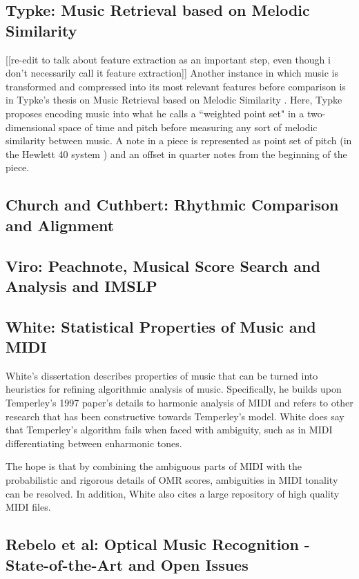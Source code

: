 \subsection{Typke: Music Retrieval based on Melodic Similarity}
[[re-edit to talk about feature extraction as an important step, even though i don't necessarily call it feature extraction]]
Another instance in which music is transformed and compressed into its most relevant features before comparison is in Typke's thesis on Music Retrieval based on Melodic Similarity \cite{typke}. Here, Typke proposes encoding music into what he calls a ``weighted point set" in a two-dimensional space of time and pitch before measuring any sort of melodic similarity between music. A note in a piece is represented as point set of pitch (in the Hewlett 40 system \cite{typke}) and an offset in quarter notes from the beginning of the piece.

\subsection{Church and Cuthbert: Rhythmic Comparison and Alignment}
\subsection{Viro: Peachnote, Musical Score Search and Analysis and IMSLP}
\subsection{White: Statistical Properties of Music and MIDI}
White's dissertation \cite{white} describes properties of music that can be turned into heuristics for refining algorithmic analysis of music. Specifically, he builds upon Temperley's 1997 \cite{temperley} paper's details to harmonic analysis of MIDI and refers to other research that has been constructive towards Temperley's model. White does say that Temperley's algorithm fails when faced with ambiguity, such as in MIDI differentiating between enharmonic tones. 

The hope is that by combining the ambiguous parts of MIDI with the probabilistic and rigorous details of OMR scores, ambiguities in MIDI tonality can be resolved. In addition, White also cites a large repository of high quality MIDI files. 
\subsection{Rebelo et al: Optical Music Recognition - State-of-the-Art and Open Issues}
\cite{rebelo}